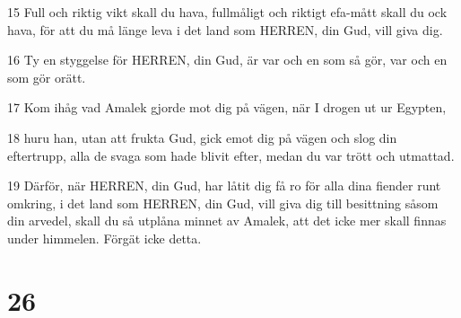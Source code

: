 \par 15 Full och riktig vikt skall du hava, fullmåligt och riktigt efa-mått skall du ock hava, för att du må länge leva i det land som HERREN, din Gud, vill giva dig.
\par 16 Ty en styggelse för HERREN, din Gud, är var och en som så gör, var och en som gör orätt.
\par 17 Kom ihåg vad Amalek gjorde mot dig på vägen, när I drogen ut ur Egypten,
\par 18 huru han, utan att frukta Gud, gick emot dig på vägen och slog din eftertrupp, alla de svaga som hade blivit efter, medan du var trött och utmattad.
\par 19 Därför, när HERREN, din Gud, har låtit dig få ro för alla dina fiender runt omkring, i det land som HERREN, din Gud, vill giva dig till besittning såsom din arvedel, skall du så utplåna minnet av Amalek, att det icke mer skall finnas under himmelen. Förgät icke detta.

\chapter{26}

